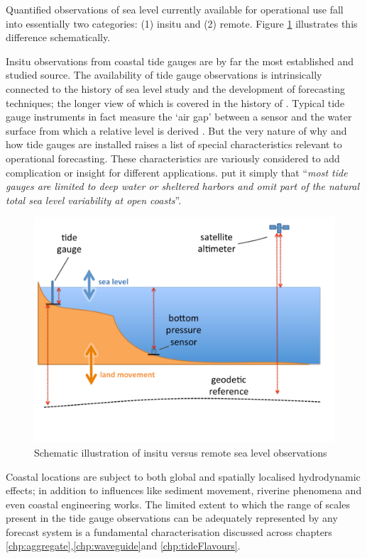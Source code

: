 Quantified observations of sea level currently available for operational use fall into essentially two categories: (1) insitu and (2) remote.    Figure \ref{fig:sealevelObsCartoon} illustrates this difference schematically.

Insitu observations from coastal tide gauges are by far the most established and studied source.    The availability of tide gauge observations is intrinsically connected to the history of sea level study and the development of forecasting techniques; the longer view of which is covered in the history of \citeauthor{Cartwright:2000tt}.
Typical tide gauge instruments in fact measure the `air gap' between a sensor and the water surface from which a relative level is derived \citep{PCTMSL-sp9}. 
But the very nature of why and how tide gauges are installed raises a list of special characteristics relevant to operational forecasting. These characteristics are variously considered to add complication or insight for different applications. \citeauthor{10.1175/jtech-d-18-0203.1} put it simply that ``\textit{most tide gauges are limited to deep water or sheltered harbors and omit part of the natural total sea level variability at open coasts}''.   
\begin{figure}[H]\centering
  \includegraphics[width=\figwidthBig]{figures/diagrams/sealevel_cartoon.pdf}
  \caption{Schematic illustration of insitu versus remote sea level observations}
  \label{fig:sealevelObsCartoon}
\end{figure}
Coastal locations are subject to both global and spatially localised hydrodynamic effects; in addition to influences like sediment movement, riverine phenomena and even coastal engineering works.  The limited extent to which the range of scales present in the tide gauge observations can be adequately represented by any forecast system is a fundamental characterisation discussed across chapters \ref{chp:aggregate},\ref{chp:waveguide}and \ref{chp:tideFlavours}.    
